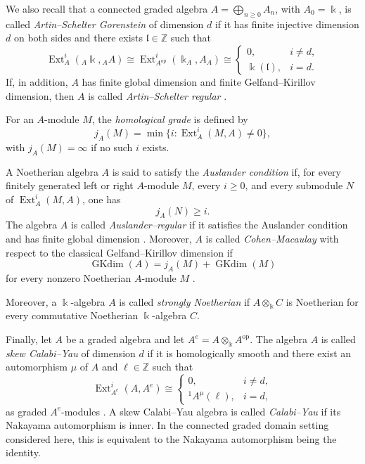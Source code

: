 \documentclass[11pt]{article}
\theoremstyle{definition}
\newcommand{\K}{\Bbbk}
\begin{document}
We also recall that a connected graded algebra
\(A=\bigoplus_{n\geq0}A_n\), with \(A_0=\K\), is called
\emph{Artin--Schelter Gorenstein} of dimension \(d\) if it has finite
injective dimension \(d\) on both sides and there exists
\(\mathfrak l\in\mathbb Z\) such that
\[
\operatorname{Ext}_{A}^{i}({}_A\K,{}_AA)
\cong
\operatorname{Ext}_{A^{\mathrm{op}}}^{i}(\K_A,A_A)
\cong
\begin{cases}
0, & i\neq d,\\
\K(\mathfrak l), & i=d.
\end{cases}
\]
If, in addition, \(A\) has finite global dimension and finite
Gelfand--Kirillov dimension, then \(A\) is called
\emph{Artin--Schelter regular}
\cite[Definition~0.1]{ChanGaddisWonZhang2025}.

For an \(A\)-module \(M\), the \emph{homological grade} is defined by
\[
j_A(M)=\min\{i:\operatorname{Ext}_A^i(M,A)\neq0\},
\]
with \(j_A(M)=\infty\) if no such \(i\) exists. 

A Noetherian algebra \(A\) is said to satisfy the
\emph{Auslander condition} if, for every finitely generated left or
right \(A\)-module \(M\), every \(i\geq0\), and every submodule
\(N\) of \(\operatorname{Ext}_A^i(M,A)\), one has
\[
j_A(N)\geq i.
\]
The algebra \(A\) is called \emph{Auslander--regular} if it satisfies
the Auslander condition and has finite global dimension
\cite[Definition~2.1]{LezamaVenegas2017Homological}. Moreover, \(A\) is
called \emph{Cohen--Macaulay} with respect to the classical
Gelfand--Kirillov dimension if
\[
\operatorname{GKdim}(A)
=
j_A(M)+\operatorname{GKdim}(M)
\]
for every nonzero Noetherian \(A\)-module \(M\)
\cite[Definition~3.1]{LezamaVenegas2017Homological}.


 Moreover, a
\(\K\)-algebra \(A\) is called \emph{strongly Noetherian} if
\(A\otimes_{\K}C\) is Noetherian for every commutative Noetherian
\(\K\)-algebra \(C\).

Finally, let \(A\) be a graded algebra and let
\(A^e=A\otimes_{\K}A^{\operatorname{op}}\). The algebra \(A\) is called
\emph{skew Calabi--Yau} of dimension \(d\) if it is homologically smooth
and there exist an automorphism \(\mu\) of \(A\) and
\(\ell\in\mathbb Z\) such that
\[
\operatorname{Ext}_{A^e}^{i}(A,A^e)
\cong
\begin{cases}
0, & i\neq d,\\
{}^{1}\!A^{\mu}(\ell), & i=d,
\end{cases}
\]
as graded \(A^e\)-modules
\cite[Definition~0.1]{ReyesRogalskiZhang2014}.
A skew Calabi--Yau algebra is called \emph{Calabi--Yau} if its Nakayama
automorphism is inner. In the connected graded domain setting considered
here, this is equivalent to the Nakayama automorphism being the identity.
\end{document}
